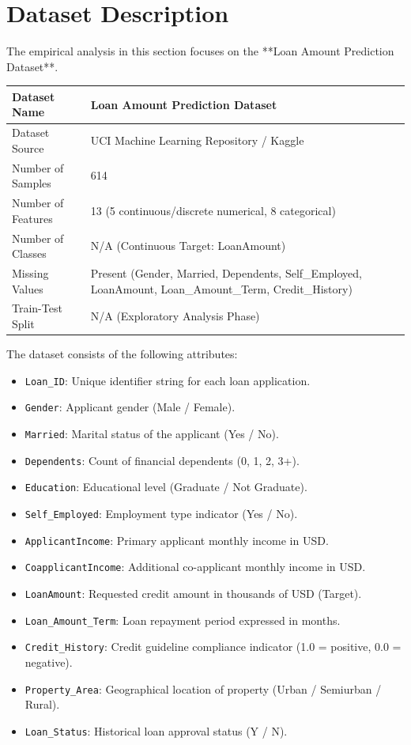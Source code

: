 \documentclass[12pt,a4paper]{article}
\begin{document}
\section{Dataset Description}
The empirical analysis in this section focuses on the **Loan Amount Prediction Dataset**.

\begin{longtable}{|p{6cm}|p{8cm}|}
\hline
Dataset Name & Loan Amount Prediction Dataset \\ \hline
Dataset Source & UCI Machine Learning Repository / Kaggle \\ \hline
Number of Samples & 614 \\ \hline
Number of Features & 13 (5 continuous/discrete numerical, 8 categorical) \\ \hline
Number of Classes & N/A (Continuous Target: LoanAmount) \\ \hline
Missing Values & Present (Gender, Married, Dependents, Self\_Employed, LoanAmount, Loan\_Amount\_Term, Credit\_History) \\ \hline
Train-Test Split & N/A (Exploratory Analysis Phase) \\ \hline
\end{longtable}

The dataset consists of the following attributes:
\begin{itemize}[noitemsep]
    \item \texttt{Loan\_ID}: Unique identifier string for each loan application.
    \item \texttt{Gender}: Applicant gender (Male / Female).
    \item \texttt{Married}: Marital status of the applicant (Yes / No).
    \item \texttt{Dependents}: Count of financial dependents (0, 1, 2, 3+).
    \item \texttt{Education}: Educational level (Graduate / Not Graduate).
    \item \texttt{Self\_Employed}: Employment type indicator (Yes / No).
    \item \texttt{ApplicantIncome}: Primary applicant monthly income in USD.
    \item \texttt{CoapplicantIncome}: Additional co-applicant monthly income in USD.
    \item \texttt{LoanAmount}: Requested credit amount in thousands of USD (Target).
    \item \texttt{Loan\_Amount\_Term}: Loan repayment period expressed in months.
    \item \texttt{Credit\_History}: Credit guideline compliance indicator (1.0 = positive, 0.0 = negative).
    \item \texttt{Property\_Area}: Geographical location of property (Urban / Semiurban / Rural).
    \item \texttt{Loan\_Status}: Historical loan approval status (Y / N).
\end{itemize}
\end{document}
